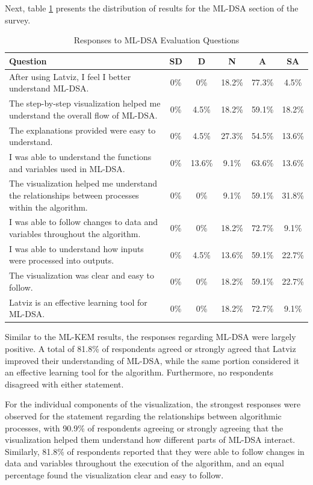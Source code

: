 \documentclass[runningheads]{llncs}
\begin{document}
Next, table \ref{tab:mldsaresults} presents the distribution of results for the ML-DSA section of the survey. 

\begin{table}[H]
\centering
\caption{Responses to ML-DSA Evaluation Questions}
\label{tab:mldsaresults}
\begin{tabular}{|p{7cm}|c|c|c|c|c|}
\hline
Question & SD & D & N & A & SA \\
\hline
After using Latviz, I feel I better understand ML-DSA. & 0\% & 0\% & 18.2\% & 77.3\% & 4.5\% \\
\hline
The step-by-step visualization helped me understand the overall flow of ML-DSA. & 0\% & 4.5\% & 18.2\% & 59.1\% & 18.2\% \\
\hline
The explanations provided were easy to understand. & 0\% & 4.5\% & 27.3\% & 54.5\% & 13.6\% \\
\hline
I was able to understand the functions and variables used in ML-DSA. & 0\% & 13.6\% & 9.1\% & 63.6\% & 13.6\% \\
\hline
The visualization helped me understand the relationships between processes within the algorithm. & 0\% & 0\% & 9.1\% & 59.1\% & 31.8\% \\
\hline
I was able to follow changes to data and variables throughout the algorithm. & 0\% & 0\% & 18.2\% & 72.7\% & 9.1\% \\
\hline
I was able to understand how inputs were processed into outputs. & 0\% & 4.5\% & 13.6\% & 59.1\% & 22.7\% \\
\hline
The visualization was clear and easy to follow. & 0\% & 0\% & 18.2\% & 59.1\% & 22.7\% \\
\hline
Latviz is an effective learning tool for ML-DSA. & 0\% & 0\% & 18.2\% & 72.7\% & 9.1\% \\
\hline
\end{tabular}
\end{table}

Similar to the ML-KEM results, the responses regarding ML-DSA were largely positive. A total of 81.8\% of respondents agreed or strongly agreed that Latviz improved their understanding of ML-DSA, while the same portion considered it an effective learning tool for the algorithm. Furthermore, no respondents disagreed with either statement.

For the individual components of the visualization, the strongest responses were observed for the statement regarding the relationships between algorithmic processes, with 90.9\% of respondents agreeing or strongly agreeing that the visualization helped them understand how different parts of ML-DSA interact. Similarly, 81.8\% of respondents reported that they were able to follow changes in data and variables throughout the execution of the algorithm, and an equal percentage found the visualization clear and easy to follow.
\end{document}
